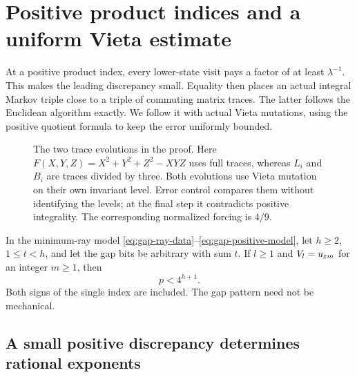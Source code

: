 \section{Positive product indices and a uniform Vieta estimate}
\label{sec:positive}

At a positive product index, every lower-state visit pays a factor of
at least $\lambda^{-1}$. This makes the leading discrepancy small.
Equality then places an actual integral Markov triple close to a
triple of commuting matrix traces. The latter follows the Euclidean
algorithm exactly. We follow it with actual Vieta mutations, using
the positive quotient formula to keep the error uniformly bounded.

\begin{figure}[tb]
 \centering
 
 \caption{The two trace evolutions in the proof. Here
 $F(X,Y,Z)=X^2+Y^2+Z^2-XYZ$ uses full traces, whereas $L_i$ and
 $B_i$ are traces divided by three. Both evolutions use Vieta mutation
 on their own invariant level. Error control compares them without
 identifying the levels; at the final step it contradicts positive
 integrality. The corresponding normalized forcing is $4/9$.}
 \label{fig:vieta-comparison}
\end{figure}

\begin{theorem}
\label{thm:positive-bound}
In the minimum-ray model \eqref{eq:gap-ray-data}--\eqref{eq:gap-positive-model},
let $h\geqslant2$, $1\leqslant t<h$, and let the gap bits be arbitrary
with sum $t$. If $l\geqslant1$ and $V_l=u_{\varepsilon m}$ for an integer
$m\geqslant1$, then
\begin{equation}\label{eq:positive-final-bound}
 p<4^{h+1}.
\end{equation}
Both signs of the single index are included. The gap pattern need not
be mechanical.
\end{theorem}

\subsection{A small positive discrepancy determines rational exponents}

